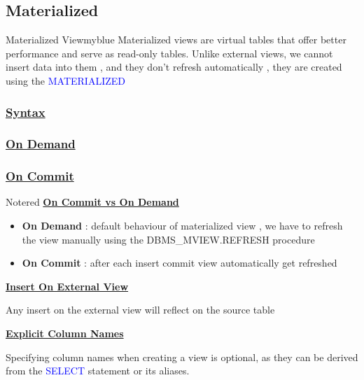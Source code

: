 

\subsection{Materialized}


\begin{prettyBox}{Materialized View}{myblue}
Materialized views are virtual tables that offer better performance and serve as read-only tables. Unlike external views, we cannot insert data into them , and they don't
refresh automatically , they are created using the \textcolor{blue}{MATERIALIZED}
\end{prettyBox}

\subsubsection*{\underline{Syntax}}

\subsubsection*{\underline{On Demand}}



\subsubsection*{\underline{On Commit}} 


\begin{prettyBox}{Note}{red}
\textbf{\underline{On Commit vs On Demand}}
\begin{itemize}
    \item \textbf{On Demand} : default behaviour of materialized view , we have to refresh the view
manually using the DBMS\_MVIEW.REFRESH procedure
    \item \textbf{On Commit} : after each insert commit view automatically get refreshed
\end{itemize}

\vspace{0.15cm}
\textbf{\underline{Insert On External View}}

\vspace{0.15cm}
Any insert on the external view will reflect on the source table 

\vspace{0.25cm}

\textbf{\underline{Explicit Column Names}}

\vspace{0.15cm}

Specifying column names when creating a view is optional, as they can be derived from the \textcolor{blue}{SELECT} statement or its aliases.

\end{prettyBox}
